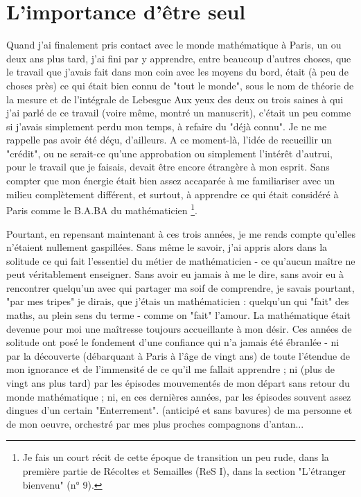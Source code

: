 \section{L'importance d'être seul}

Quand j'ai finalement pris contact avec le monde mathématique à Paris, un ou deux ans plus tard, j'ai fini par y apprendre, entre beaucoup d'autres choses, que le travail que j'avais fait dans mon coin avec les moyens du bord, était (à peu de choses près) ce qui était bien connu de "tout le monde", sous le nom de théorie de la mesure et de l'intégrale de Lebesgue Aux yeux des deux ou trois saines à qui j'ai parlé de ce travail (voire même, montré un manuscrit), c'était un peu comme si j'avais simplement perdu mon temps, à refaire du "déjà connu". Je ne me rappelle pas avoir été déçu, d'ailleurs. A ce moment-là, l'idée de recueillir un "crédit", ou ne serait-ce qu'une approbation ou simplement l'intérêt d'autrui, pour le travail que je faisais, devait être encore étrangère à mon esprit. Sans compter que mon énergie était bien assez accaparée à me familiariser avec un milieu complètement différent, et surtout, à apprendre ce qui était considéré à Paris comme le B.A.BA du mathématicien \footnote{Je fais un court récit de cette époque de transition un peu rude, dans la première partie de Récoltes et Semailles (ReS I), dans la section "L'étranger bienvenu" (n° 9).}.

Pourtant, en repensant maintenant à ces trois années, je me rends compte qu'elles n'étaient nullement gaspillées. Sans même le savoir, j'ai appris alors dans la solitude ce qui fait l'essentiel du métier de mathématicien - ce qu'aucun maître ne peut véritablement enseigner. Sans avoir eu jamais à me le dire, sans avoir eu à rencontrer quelqu'un avec qui partager ma soif de comprendre, je savais pourtant, "par mes tripes" je dirais, que j'étais un mathématicien : quelqu'un qui "fait" des maths, au plein sens du terme - comme on "fait" l'amour. La mathématique était devenue pour moi une maîtresse toujours accueillante à mon désir. Ces années de solitude ont posé le fondement d'une confiance qui n'a jamais été ébranlée - ni par la découverte (débarquant à Paris à l'âge de vingt ans) de toute l'étendue de mon ignorance et de l'immensité de ce qu'il me fallait apprendre ; ni (plus de vingt ans plus tard) par les épisodes mouvementés de mon départ sans retour du monde mathématique ; ni, en ces dernières années, par les épisodes souvent assez dingues d'un certain "Enterrement". (anticipé et sans bavures) de ma personne et de mon oeuvre, orchestré par mes plus proches compagnons d'antan...

